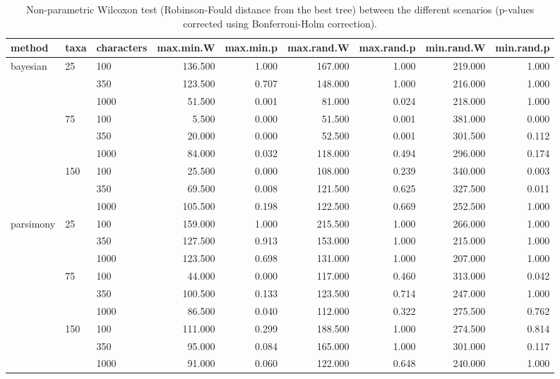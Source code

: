 \begin{table}[ht]
\centering
\begin{tabular}{lllrrrrrr}
  \hline
method & taxa & characters & max.min.W & max.min.p & max.rand.W & max.rand.p & min.rand.W & min.rand.p \\ 
  \hline
bayesian & 25 & 100 & 136.500 & 1.000 & 167.000 & 1.000 & 219.000 & 1.000 \\ 
   &  & 350 & 123.500 & 0.707 & 148.000 & 1.000 & 216.000 & 1.000 \\ 
   &  & 1000 & 51.500 & 0.001 & 81.000 & 0.024 & 218.000 & 1.000 \\ 
   & 75 & 100 & 5.500 & 0.000 & 51.500 & 0.001 & 381.000 & 0.000 \\ 
   &  & 350 & 20.000 & 0.000 & 52.500 & 0.001 & 301.500 & 0.112 \\ 
   &  & 1000 & 84.000 & 0.032 & 118.000 & 0.494 & 296.000 & 0.174 \\ 
   & 150 & 100 & 25.500 & 0.000 & 108.000 & 0.239 & 340.000 & 0.003 \\ 
   &  & 350 & 69.500 & 0.008 & 121.500 & 0.625 & 327.500 & 0.011 \\ 
   &  & 1000 & 105.500 & 0.198 & 122.500 & 0.669 & 252.500 & 1.000 \\ 
  parsimony & 25 & 100 & 159.000 & 1.000 & 215.500 & 1.000 & 266.000 & 1.000 \\ 
   &  & 350 & 127.500 & 0.913 & 153.000 & 1.000 & 215.000 & 1.000 \\ 
   &  & 1000 & 123.500 & 0.698 & 131.000 & 1.000 & 207.000 & 1.000 \\ 
   & 75 & 100 & 44.000 & 0.000 & 117.000 & 0.460 & 313.000 & 0.042 \\ 
   &  & 350 & 100.500 & 0.133 & 123.500 & 0.714 & 247.000 & 1.000 \\ 
   &  & 1000 & 86.500 & 0.040 & 112.000 & 0.322 & 275.500 & 0.762 \\ 
   & 150 & 100 & 111.000 & 0.299 & 188.500 & 1.000 & 274.500 & 0.814 \\ 
   &  & 350 & 95.000 & 0.084 & 165.000 & 1.000 & 301.000 & 0.117 \\ 
   &  & 1000 & 91.000 & 0.060 & 122.000 & 0.648 & 240.000 & 1.000 \\ 
   \hline
\end{tabular}
\caption{Non-parametric Wilcoxon test (Robinson-Fould distance from the best tree) between the different scenarios (p-values corrected using Bonferroni-Holm correction).} 
\label{Full_Tab_BCRFbest}
\end{table}
